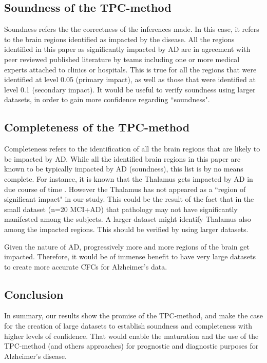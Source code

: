 \documentclass[12pt,reqno]{amsart}
\theoremstyle{definition}
\begin{document}
\subsection*{Soundness of the TPC-method}
Soundness refers the the correctness of the inferences made. In this case, it refers to the brain regions identified
as impacted by the disease.
All the regions identified in this paper as significantly impacted by  AD are in agreement with peer reviewed
published literature by teams including one or more medical experts attached to clinics or hospitals. This is true for
all the regions that were identified at level 0.05 (primary impact), as well as those that were identified at level
0.1 (secondary impact).
It would be useful to verify soundness using larger datasets, in order to gain more confidence regarding ``soundness".

\subsection*{Completeness of the TPC-method}
Completeness refers to the identification of all the brain regions that are likely to be impacted by AD.
While all the identified brain regions in this paper are known to be typically impacted by AD (soundness), this list is by no means
complete. For instance, it is known that the Thalamus gets impacted by AD in due course of time \citep{vstepan2014cortical}. However the Thalamus
has not appeared as a ``region of significant impact" in our study. This could be the result of the fact that in the
small dataset (n=20 MCI+AD) that pathology may not have significantly manifested among the subjects.
A larger dataset might identify Thalamus also among the impacted regions. This should be verified by using larger datasets.

Given the nature of AD, progressively more and more regions of the brain get impacted.
Therefore, it would be of immense benefit to have very large datasets to create more accurate CFCs for Alzheimer's data.

\subsection*{Conclusion} In summary, our results show the promise of the TPC-method, and make the case for the creation of large datasets to
establish soundness and completeness with higher levels of confidence. That would enable the maturation and the use
of the TPC-method (and others approaches) for prognostic and diagnostic purposes for Alzheimer's disease.
\end{document}
